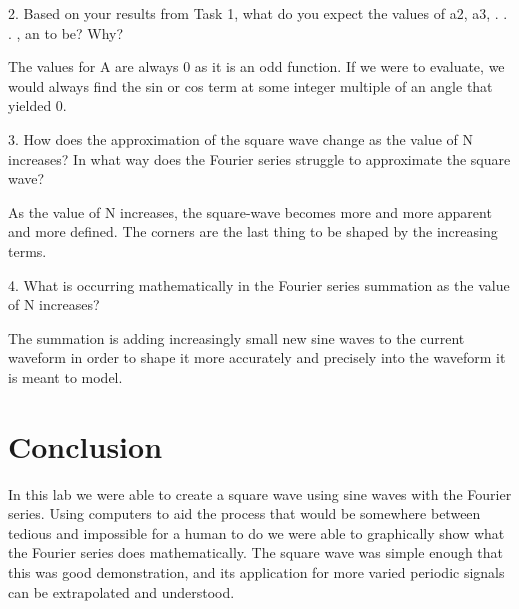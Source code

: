 \documentclass[12pt,a4paper]{article}
\begin{document}
	2. Based on your results from Task 1, what do you expect the values of a2, a3, . . . , an to be?
	Why?\vspace{6pt}
	
	     The values for A are always 0 as it is an odd function. If we were to evaluate, we would always find the sin or cos term at some integer multiple of an angle that yielded 0. \vspace{6pt}
	
	3. How does the approximation of the square wave change as the value of N increases? In what
	way does the Fourier series struggle to approximate the square wave?\vspace{6pt}
	
	     As the value of N increases, the square-wave becomes more and more apparent and more defined. The corners are the last thing to be shaped by the increasing terms.\vspace{6pt}  
	
	4. What is occurring mathematically in the Fourier series summation as the value of N increases?\vspace{6pt}
	
	     The summation is adding increasingly small new sine waves to the current waveform in order to shape it more accurately and precisely into the waveform it is meant to model. \vspace{6pt}



\section{Conclusion}
	In this lab we were able to create a square wave using sine waves with the Fourier series. Using computers to aid the process that would be somewhere between tedious and impossible for a human to do we were able to graphically show what the Fourier series does mathematically. The square wave was simple enough that this was good demonstration, and its application for more varied periodic signals can be extrapolated and understood. 
	
\end{document}
